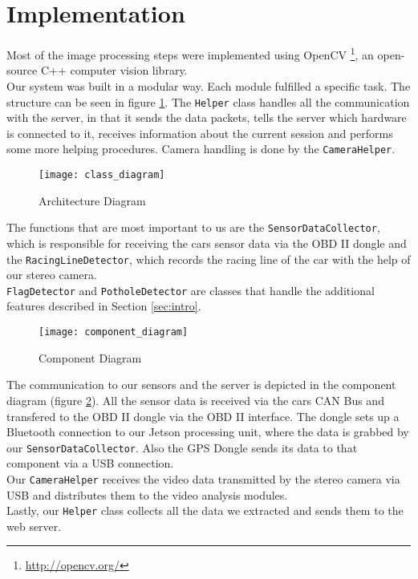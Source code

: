 \section{Implementation}
\label{sec:implementation}

Most of the image processing steps were implemented using OpenCV \footnote{\url{http://opencv.org/}}, an open-source C++ computer vision library.\\
Our system was built in a modular way. Each module fulfilled a specific task. The structure can be seen in figure \ref{fig:class_diagram}. The \texttt{Helper} class handles all the communication with the server, in that it sends the data packets, tells the server which hardware is connected to it, receives information about the current session and performs some more helping procedures. Camera handling is done by the \texttt{CameraHelper}.

\begin{figure}[!ht]
\centering
\texttt{[image: class\_diagram]}
\caption{Architecture Diagram}
\label{fig:class_diagram}
\end{figure}

\clearpage

The functions that are most important to us are the \texttt{SensorDataCollector}, which is responsible for receiving the cars sensor data via the OBD II dongle and the \texttt{RacingLineDetector}, which records the racing line of the car with the help of our stereo camera.\\
\texttt{FlagDetector} and \texttt{PotholeDetector} are classes that handle the additional features described in Section \ref{sec:intro}.

\begin{figure}[!ht]
	\texttt{[image: component\_diagram]}
	\caption{Component Diagram}
	\label{fig:component_diagram}
\end{figure}
\clearpage
The communication to our sensors and the server is depicted in the component diagram (figure \ref{fig:component_diagram}). All the sensor data is received via the cars CAN Bus and transfered to the OBD II dongle via the OBD II interface. The dongle sets up a Bluetooth connection to our Jetson processing unit, where the data is grabbed by our \texttt{SensorDataCollector}. Also the GPS Dongle sends its data to that component via a USB connection.\\
Our \texttt{CameraHelper} receives the video data transmitted by the stereo camera via USB and distributes them to the video analysis modules.\\
Lastly, our \texttt{Helper} class collects all the data we extracted and sends them to the web server.

